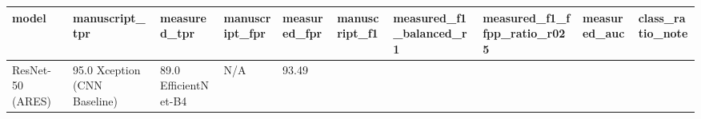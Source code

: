 \begin{tabular}{llllllllll}
\toprule
model & manuscript_tpr & measured_tpr & manuscript_fpr & measured_fpr & manuscript_f1 & measured_f1_balanced_r1 & measured_f1_ffpp_ratio_r025 & measured_auc & class_ratio_note \\
\midrule
ResNet-50 (ARES) & 95.0%
Xception (CNN Baseline) & 89.0%
EfficientNet-B4 & N/A & 93.49%
\bottomrule
\end{tabular}
